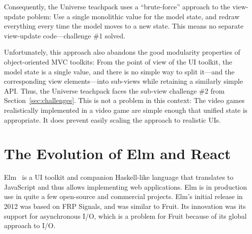 \documentclass[sigplan,screen]{acmart}
\begin{document}
Consequently, the Universe teachpack uses a ``brute-force'' approach
to the view-update poblem: Use a single monolithic value for the model
state, and redraw everything every time the model moves to a new
state.  This means no separate view-update code---challenge \#1
solved.

Unfortunately, this approach also abandons the good modularity
properties of object-oriented MVC toolkits: From the point of view of
the UI toolkit, the model state is a single value, and there is no
simple way to split it---and the corresponding view elements---into
sub-views while retaining a similarly simple API.  Thus, the Universe
teachpack faces the sub-view challenge \#2 from
Section~\ref{sec:challenges}.  This is not a
problem in this context: The video games realistically implemented in
a video game are simple enough that unified state is appropriate.  It
does prevent easily scaling the approach to realistic UIs.


\section{The Evolution of Elm and React}
\label{sec:elm-react}

Elm~\cite{Elm} is a UI toolkit and companion Haskell-like language
that translates to JavaScript and thus allows implementing web
applications.  Elm is in production use in quite a few open-source and
commercial projects.  Elm's initial release in 2012 was based on FRP Signals,
and was similar to Fruit.  Its innovation was its support for
asynchronous I/O, which is a problem for Fruit because of its global
approach to I/O.
\end{document}
